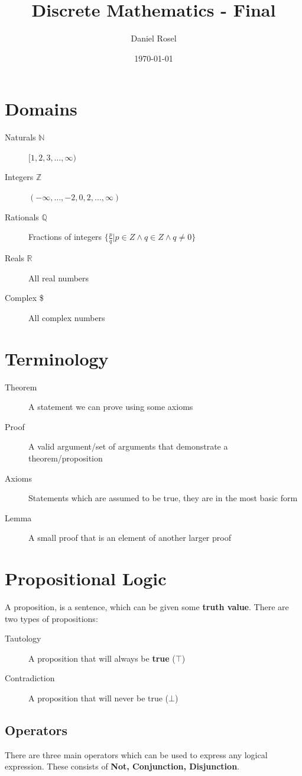 \documentclass[11pt]{article}
\author{Daniel Rosel}
\date{\today}
\title{Discrete Mathematics - Final}
\begin{document}
\maketitle
\tableofcontents


\section{Domains}
\label{sec:orgad83699}
\begin{description}
\item[{Naturals \(\mathbb{N}\)}] \([1,2,3,\ldots,\infty)\)
\item[{Integers \(\mathbb{Z}\)}] \((-\infty,\ldots,-2,0,2,\ldots,\infty)\)
\item[{Rationals \(\mathbb{Q}\)}] Fractions of integers \(\{ \frac{p}{q} \vert p \in Z \land q \in Z \land q \ne 0 \}\)
\item[{Reals \(\mathbb{R}\)}] All real numbers
\item[{Complex \$}] All complex numbers
\end{description}
\section{Terminology}
\label{sec:org55ee601}
\begin{description}
\item[{Theorem}] A statement we can prove using some axioms
\item[{Proof}] A valid argument/set of arguments that demonstrate a theorem/proposition
\item[{Axioms}] Statements which are assumed to be true, they are in the most basic form
\item[{Lemma}] A small proof that is an element of another larger proof
\end{description}
\section{Propositional Logic}
\label{sec:org645862d}
A proposition, is a sentence, which can be given some \textbf{truth value}.
There are two types of propositions:
\begin{description}
\item[{Tautology}] A proposition that will always be \textbf{true} (\(\top\))
\item[{Contradiction}] A proposition that will never be true (\(\bot\))
\end{description}
\subsection{Operators}
\label{sec:org02873c8}
There are three main operators which can be used to express any logical expression. These consists of \textbf{Not, Conjunction, Disjunction}.
\end{document}
